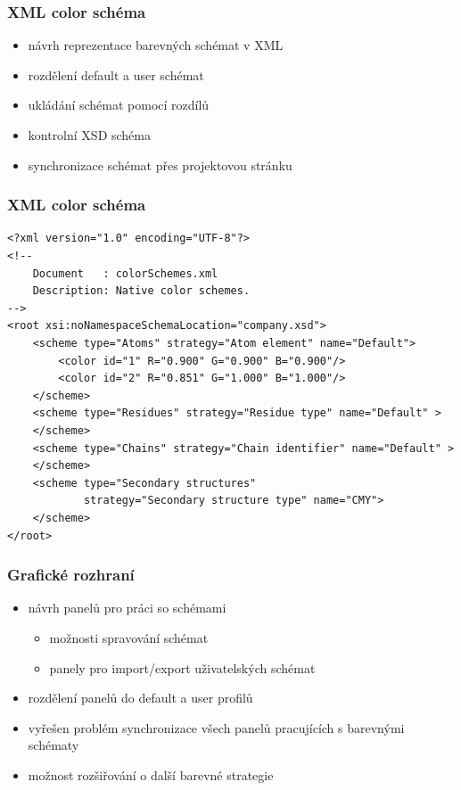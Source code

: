 \documentclass[slovak]{beamer}
\begin{document}
\begin{frame}
\frametitle{XML color schéma}
	\begin{itemize}
		\item návrh reprezentace barevných schémat v XML
		\item rozdělení default a user schémat
		\item ukládání schémat pomocí rozdílů
		\item kontrolní XSD schéma
		\item synchronizace schémat přes projektovou stránku
	\end{itemize}
\end{frame}

\begin{frame}[fragile]
\frametitle{XML color schéma}
	\lstset{language=XML}
	\scriptsize{
	\begin{lstlisting}
<?xml version="1.0" encoding="UTF-8"?>
<!--
    Document   : colorSchemes.xml
    Description: Native color schemes.
-->
<root xsi:noNamespaceSchemaLocation="company.xsd">
    <scheme type="Atoms" strategy="Atom element" name="Default">
        <color id="1" R="0.900" G="0.900" B="0.900"/>
        <color id="2" R="0.851" G="1.000" B="1.000"/>
    </scheme>
    <scheme type="Residues" strategy="Residue type" name="Default" >
    </scheme>
    <scheme type="Chains" strategy="Chain identifier" name="Default" >
    </scheme>
    <scheme type="Secondary structures"
	        strategy="Secondary structure type" name="CMY">
    </scheme>
</root>
	\end{lstlisting}}
\end{frame}

\begin{frame}
\frametitle{Grafické rozhraní}
	\begin{itemize}
		\item návrh panelů pro práci so schémami
		\begin{itemize}
			\item možnosti spravování schémat
			\item panely pro import/export uživatelských schémat
		\end{itemize}
		\item rozdělení panelů do default a user profilů
		\item vyřešen problém synchronizace všech panelů pracujících s barevnými schématy
		\item možnost rozšiřování o další barevné strategie
	\end{itemize}
\end{frame}
\end{document}
